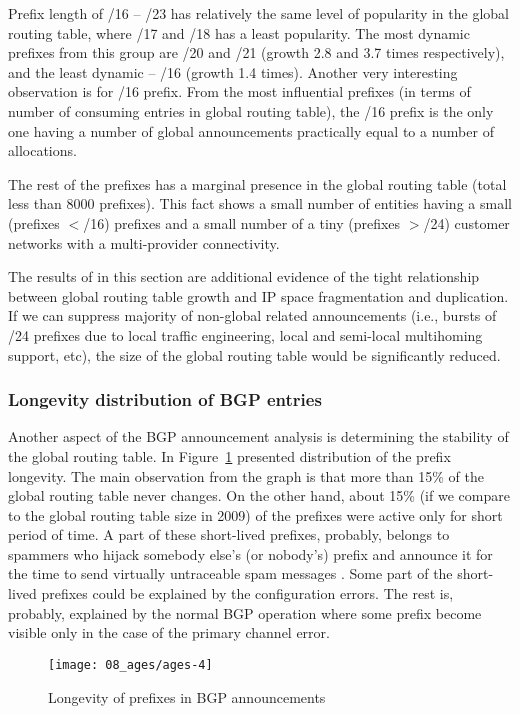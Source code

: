 Prefix length of /16 -- /23 has relatively the same level of popularity in the
global routing table, where /17 and /18 has a least popularity. The most
dynamic prefixes from this group are /20 and /21 (growth 2.8 and 3.7 times
respectively), and the least dynamic -- /16 (growth 1.4 times). Another very
interesting observation is for /16 prefix. From the most influential prefixes
(in terms of number of consuming entries in global routing table), the /16
prefix is the only one having a number of global announcements practically
equal to a number of allocations.

The rest of the prefixes has a marginal presence in the global routing table
(total less than 8000 prefixes). This fact shows a small number of entities
having a small (prefixes $<$/16) prefixes and a small number of a tiny
(prefixes $>$/24) customer networks with a multi-provider connectivity.

The results of in this section are additional evidence of the tight
relationship between global routing table growth and IP space fragmentation
and duplication. If we can suppress majority of non-global related
announcements (i.e., bursts of /24 prefixes due to local traffic engineering,
local and semi-local multihoming support, etc), the size of the global routing
table would be significantly reduced.

\subsubsection{Longevity distribution of BGP entries}

Another aspect of the BGP announcement analysis is determining the stability
of the global routing table. In Figure~\ref{fig:bgp ages} presented
distribution of the prefix longevity. The main observation from the graph is
that more than 15\% of the global routing table never changes. On the other
hand, about 15\% (if we compare to the global routing table size in 2009) of
the prefixes were active only for short period of time. A part of these
short-lived prefixes, probably, belongs to spammers who hijack somebody else's
(or nobody's) prefix and announce it for the time to send virtually
untraceable spam messages
\cite{Ramachandran:2006:Understanding-the-network-level}. Some part of the
short-lived prefixes could be explained by the configuration errors. The rest
is, probably, explained by the normal BGP operation where some prefix become
visible only in the case of the primary channel error.

\begin{figure}[htbp]
	\centering
		\texttt{[image: 08\_ages/ages-4]}
	\caption{Longevity of prefixes in BGP announcements}
	\label{fig:bgp ages}
\end{figure}

